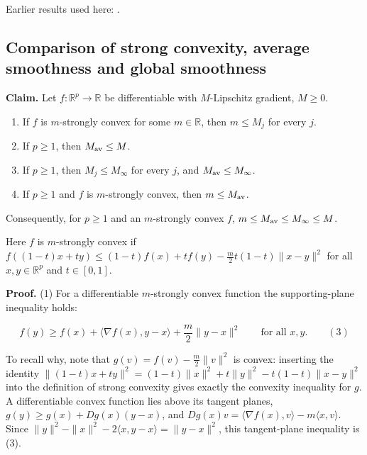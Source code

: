 \documentclass[11pt,a4paper]{report}
\begin{document}
Earlier results used here: \cite[Section~3.9.1]{LangevinLean2026ULASC}.
\subsection{\texorpdfstring{Comparison of strong convexity, average smoothness and global smoothness}{Comparison of strong convexity, average smoothness and global smoothness}}
\label{report-step-AverageLMC-Assumptions-lean-4}


\textbf{Claim.} Let \(f:\mathbb R^p\to\mathbb R\) be differentiable with \(M\)-Lipschitz gradient, \(M\ge0\).



\begin{enumerate}


\item If \(f\) is \(m\)-strongly convex for some \(m\in\mathbb R\), then \(m\le M_j\) for every \(j\).

\item If \(p\ge1\), then \(M_{\rm av}\le M\).

\item If \(p\ge1\), then \(M_j\le M_\infty\) for every \(j\), and \(M_{\rm av}\le M_\infty\).

\item If \(p\ge1\) and \(f\) is \(m\)-strongly convex, then \(m\le M_{\rm av}\).

\end{enumerate}



Consequently, for \(p\ge1\) and an \(m\)-strongly convex \(f\), \(m\le M_{\rm av}\le M_\infty\le M\).




Here \(f\) is \(m\)-strongly convex if \(f((1-t)x+ty)\le(1-t)f(x)+tf(y)-\frac m2t(1-t)\|x-y\|^2\) for all \(x,y\in\mathbb R^p\) and \(t\in[0,1]\).




\textbf{Proof.} (1) For a differentiable \(m\)-strongly convex function the supporting-plane inequality holds:


\[f(y)\ge f(x)+\langle\nabla f(x),y-x\rangle+\frac m2\|y-x\|^2\qquad\text{for all }x,y.\qquad(3)\]


To recall why, note that \(g(v)=f(v)-\frac m2\|v\|^2\) is convex: inserting the identity \(\|(1-t)x+ty\|^2=(1-t)\|x\|^2+t\|y\|^2-t(1-t)\|x-y\|^2\) into the definition of strong convexity gives exactly the convexity inequality for \(g\). A differentiable convex function lies above its tangent planes, \(g(y)\ge g(x)+Dg(x)(y-x)\), and \(Dg(x)v=\langle\nabla f(x),v\rangle-m\langle x,v\rangle\). Since \(\|y\|^2-\|x\|^2-2\langle x,y-x\rangle=\|y-x\|^2\), this tangent-plane inequality is (3).
\end{document}
